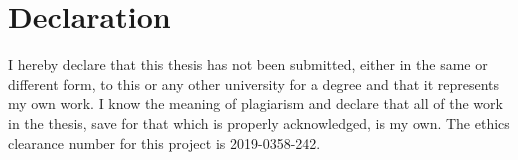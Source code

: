 \chapter*{Declaration}
I hereby declare that this thesis has not been submitted, either in the same or different form,
to this or any other university for a degree and that it represents my own work. I know the
meaning of plagiarism and declare that all of the work in the thesis, save for that which is
properly acknowledged, is my own. The ethics clearance number for this project is 2019-0358-242. 